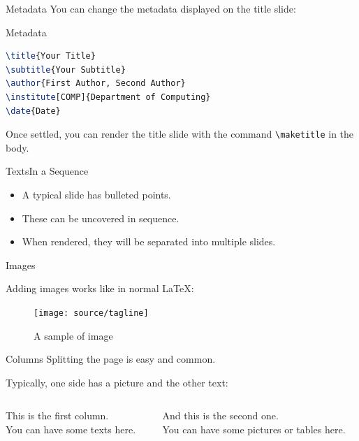 \documentclass[10pt,aspectratio=169]{beamer}
\begin{document}
\begin{frame}[fragile]{Metadata}
	You can change the metadata displayed on the title slide:

\begin{block}{Metadata}
\begin{lstlisting}[language=TeX]
\title{Your Title}
\subtitle{Your Subtitle}
\author{First Author, Second Author}
\institute[COMP]{Department of Computing}
\date{Date}
\end{lstlisting}
\end{block}

	Once settled, you can render the title slide with the command \verb|\maketitle| in the body.
\end{frame}

\begin{frame}[fragile]{Texts}{In a Sequence}

	\begin{itemize}[<+->]
		\item A typical slide has bulleted points.
		\item These can be uncovered in sequence.
		\item When rendered, they will be separated into multiple slides.
	\end{itemize}

\end{frame}

\begin{frame}{Images}

	Adding images works like in normal \LaTeX:
	
	\begin{figure}[hbt]
		\texttt{[image: source/tagline]}
 		\caption{A sample of image}
	\end{figure}
	
\end{frame}

\begin{frame}{Columns}
	Splitting the page is easy and common.

	Typically, one side has a picture and the other text:
	
	\vspace{20pt}
	
	\begin{columns}
		\begin{column}{0.6\textwidth}
			This is the first column.\\[10pt]
			You can have some texts here.
		\end{column}
		
		\begin{column}{0.3\textwidth}
			And this is the second one.\\[10pt]
			You can have some pictures or tables here.
		\end{column}
	\end{columns}

\end{frame}
\end{document}
